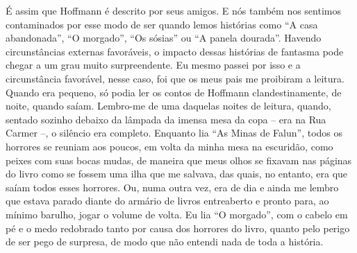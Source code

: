 É assim que Hoffmann é descrito por seus amigos. E nós também nos
sentimos contaminados por esse modo de ser quando lemos histórias como
``A casa abandonada'', ``O morgado'', ``Os sósias'' ou ``A panela
dourada''. Havendo circunstâncias externas favoráveis, o impacto dessas
histórias de fantasma pode chegar a um grau muito surpreendente. Eu
mesmo passei por isso e a circunstância favorável, nesse caso, foi que
os meus pais me proibiram a leitura. Quando era pequeno, só podia ler os
contos de Hoffmann clandestinamente, de noite, quando saíam. Lembro-me
de uma daquelas noites de leitura, quando, sentado sozinho debaixo da
lâmpada da imensa mesa da copa -- era na Rua Carmer --, o silêncio era
completo. Enquanto lia ``As Minas de Falun'', todos os horrores se
reuniam aos poucos, em volta da minha mesa na escuridão, como peixes com
suas bocas mudas, de maneira que meus olhos se fixavam nas páginas do
livro como se fossem uma ilha que me salvava, das quais, no entanto, era
que saíam todos esses horrores. Ou, numa outra vez, era de dia e ainda
me lembro que estava parado diante do armário de livros entreaberto e
pronto para, ao mínimo barulho, jogar o volume de volta. Eu lia ``O
morgado'', com o cabelo em pé e o medo redobrado tanto por causa dos
horrores do livro, quanto pelo perigo de ser pego de surpresa, de modo
que não entendi nada de toda a história.

